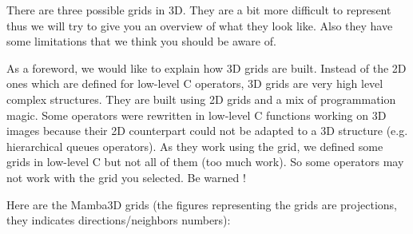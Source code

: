 \documentclass[a4paper,10pt,oneside]{article}
\begin{document}
There are three possible grids in 3D. They are a bit more
difficult to represent thus we will try to give you an overview
of what they look like. Also they have some limitations that we think you
should be aware of.

As a foreword, we would like to explain how 3D grids are built.
Instead of the 2D ones which are defined for low-level C operators, 3D
grids are very high level complex structures. They are built using 2D grids and
a mix of programmation magic. Some operators were rewritten in low-level C
functions working on 3D images because their 2D counterpart could not be adapted
to a 3D structure (e.g. hierarchical queues operators). As they work using the
grid, we defined some grids in low-level C but not all of them (too much work).
So some operators may not work with the grid you selected. Be warned !


Here are the Mamba3D grids (the figures representing the grids are projections,
they indicates directions/neighbors numbers):
\end{document}
